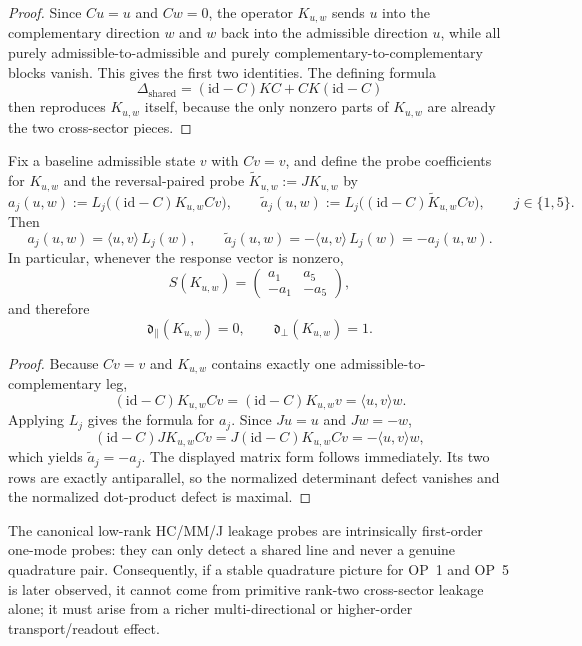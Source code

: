 \begin{proof}
Since $Cu=u$ and $Cw=0$, the operator $K_{u,w}$ sends $u$ into the complementary direction $w$ and $w$ back into the admissible direction $u$, while all purely admissible-to-admissible and purely complementary-to-complementary blocks vanish. This gives the first two identities. The defining formula
\[
  \Delta_{\mathrm{shared}}=(\mathrm{id}-C)KC + CK(\mathrm{id}-C)
\]
then reproduces $K_{u,w}$ itself, because the only nonzero parts of $K_{u,w}$ are already the two cross-sector pieces.
\end{proof}

\begin{proposition}
\label{prop:working-response-geometry-canonical-low-rank-class}
Fix a baseline admissible state $v$ with $Cv=v$, and define the probe coefficients for $K_{u,w}$ and the reversal-paired probe $\widetilde K_{u,w}:=JK_{u,w}$ by
\[
  a_j(u,w):=L_j\bigl((\mathrm{id}-C)K_{u,w}Cv\bigr),
  \qquad
  \widetilde a_j(u,w):=L_j\bigl((\mathrm{id}-C)\widetilde K_{u,w}Cv\bigr),
  \qquad j\in\{1,5\}.
\]
Then
\[
  a_j(u,w)=\langle u,v\rangle\,L_j(w),
  \qquad
  \widetilde a_j(u,w)=-\langle u,v\rangle\,L_j(w)=-a_j(u,w).
\]
In particular, whenever the response vector is nonzero,
\[
  S(K_{u,w})=
  \begin{pmatrix}
    a_1 & a_5\\
    -a_1 & -a_5
  \end{pmatrix},
\]
and therefore
\[
  \mathfrak d_{\parallel}(K_{u,w})=0,
  \qquad
  \mathfrak d_{\perp}(K_{u,w})=1.
\]
\end{proposition}

\begin{proof}
Because $Cv=v$ and $K_{u,w}$ contains exactly one admissible-to-complementary leg,
\[
  (\mathrm{id}-C)K_{u,w}Cv
  =
  (\mathrm{id}-C)K_{u,w}v
  =
  \langle u,v\rangle w.
\]
Applying $L_j$ gives the formula for $a_j$. Since $Ju=u$ and $Jw=-w$,
\[
  (\mathrm{id}-C)JK_{u,w}Cv
  =
  J(\mathrm{id}-C)K_{u,w}Cv
  =
  -\langle u,v\rangle w,
\]
which yields $\widetilde a_j=-a_j$. The displayed matrix form follows immediately. Its two rows are exactly antiparallel, so the normalized determinant defect vanishes and the normalized dot-product defect is maximal.
\end{proof}

\begin{corollary}
\label{cor:working-first-verdict-canonical-probe-class}
The canonical low-rank HC/MM/J leakage probes are intrinsically first-order one-mode probes: they can only detect a shared line and never a genuine quadrature pair. Consequently, if a stable quadrature picture for OP~1 and OP~5 is later observed, it cannot come from primitive rank-two cross-sector leakage alone; it must arise from a richer multi-directional or higher-order transport/readout effect.
\end{corollary}


